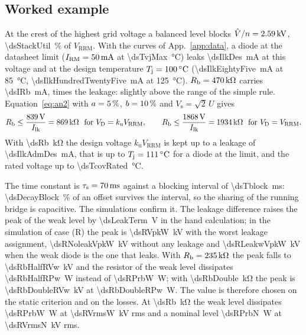 \documentclass[10pt,a4paper]{scrartcl}
\newcommand{\Vrrm}{V_\mathrm{RRM}}
\newcommand{\Irm}{I_\mathrm{RM}}
\newcommand{\Rb}{R_\mathrm{b}}
\newcommand{\Vh}{\hat V}
\newcommand{\Tj}{T_\mathrm{j}}
\newcommand{\taus}{\tau_\mathrm{s}}
\newcommand{\Ilk}{I_\mathrm{lk}}
\newcommand{\ku}{k_\mathrm{u}}
\newcommand{\caseR}{(R)}
\begin{document}
\subsection{Worked example}
At the crest of the highest grid voltage a balanced level blocks $\Vh/n = \SI{\dsVlev}{\kilo\volt}$, \SI{\dsStackUtil}{\percent} of $\Vrrm$. With the curves of App.~\ref{app:data}, a diode at the datasheet limit ($\Irm = \SI{\dsIrm}{\milli\ampere}$ at \SI{\dsTvjMax}{\celsius}) leaks \SI{\dsIlkDes}{\milli\ampere} at this voltage and at the design temperature $\Tj = \SI{\dsTjDes}{\celsius}$ (\SI{\dsIlkEightyFive}{\milli\ampere} at \SI{85}{\celsius}, \SI{\dsIlkHundredTwentyFive}{\milli\ampere} at \SI{125}{\celsius}). $\Rb = \SI{\dsRb}{\kilo\ohm}$ carries \SI{\dsIRb}{\milli\ampere}, \dsIlkRatio{} times the leakage: slightly above the range of the simple rule. Equation~\eqref{eq:an2} with $a = \SI{5}{\percent}$, $b = \SI{10}{\percent}$ and $V_\mathrm{s} = \sqrt2\,U$ gives
\begin{equation*}
\Rb \le \frac{\SI{\dsRbNumDes}{\volt}}{\Ilk} = \SI{\dsRbMaxDes}{\kilo\ohm} \ \ \text{for}\ V_\mathrm{D} = \ku\Vrrm, \qquad
\Rb \le \frac{\SI{\dsRbNumRated}{\volt}}{\Ilk} = \SI{\dsRbMaxRated}{\kilo\ohm} \ \ \text{for}\ V_\mathrm{D} = \Vrrm .
\end{equation*}
With \SI{\dsRb}{\kilo\ohm} the design voltage $\ku\Vrrm$ is kept up to a leakage of \SI{\dsIlkAdmDes}{\milli\ampere}, that is up to $\Tj = \SI{\dsTcovDes}{\celsius}$ for a diode at the limit, and the rated voltage up to \SI{\dsTcovRated}{\celsius}.

The time constant is $\taus = \SI{\dsTauB}{\milli\second}$ against a blocking interval of \SI{\dsTblock}{\milli\second}: \SI{\dsDecayBlock}{\percent} of an offset survives the interval, so the sharing of the running bridge is capacitive. The simulations confirm it. The leakage difference raises the peak of the weak level by \SI{\dsLeakTerm}{\volt} in the hand calculation; in the simulation of case \caseR{} the peak is \SI{\dsRVpkW}{\kilo\volt} with the worst leakage assignment, \SI{\dsRNoleakVpkW}{\kilo\volt} without any leakage and \SI{\dsRLeakwVpkW}{\kilo\volt} when the weak diode is the one that leaks. With $\Rb = \SI{\dsRbHalf}{\kilo\ohm}$ the peak falls to \SI{\dsRbHalfRVw}{\kilo\volt} and the resistor of the weak level dissipates \SI{\dsRbHalfRPw}{\watt} instead of \SI{\dsRPrbW}{\watt}; with \SI{\dsRbDouble}{\kilo\ohm} the peak is \SI{\dsRbDoubleRVw}{\kilo\volt} at \SI{\dsRbDoubleRPw}{\watt}. The value is therefore chosen on the static criterion and on the losses. At \SI{\dsRb}{\kilo\ohm} the weak level dissipates \SI{\dsRPrbW}{\watt} at \SI{\dsRVrmsW}{\kilo\volt} rms and a nominal level \SI{\dsRPrbN}{\watt} at \SI{\dsRVrmsN}{\kilo\volt} rms.
\end{document}
